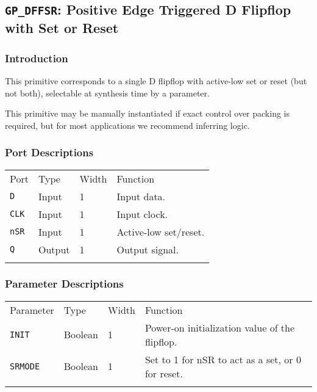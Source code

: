 \documentclass[11pt]{article}
\newcommand{\tokenstyle}[1]{\texttt{#1}}
\newcommand{\whenstyle}[1]{{\fontseries{sb}\selectfont#1}}
\newcommand{\thinhline}{\Xhline{1\arrayrulewidth}}
\newcommand{\thickhline}{\Xhline{2.5\arrayrulewidth}}
\begin{document}

\pagebreak
\subsection{\tokenstyle{GP\_DFFSR}: Positive Edge Triggered D Flipflop with Set or Reset}
\label{gp-dffsr}

\subsubsection{Introduction}
This primitive corresponds to a single D flipflop with active-low set or reset (but not both), selectable at synthesis
time by a parameter.

This primitive may be manually instantiated if exact control over packing is required, but for most applications we
recommend inferring logic.

\subsubsection{Port Descriptions}

\begin{tabularx}{\textwidth}{lllX}
\thinhline
\whenstyle{Port} & \whenstyle{Type} & \whenstyle{Width} & \whenstyle{Function} \\
\thickhline
\tokenstyle{D} & Input & 1 & Input data. \\
\thinhline
\tokenstyle{CLK} & Input & 1 & Input clock. \\
\thinhline
\tokenstyle{nSR} & Input & 1 & Active-low set/reset. \\
\thinhline
\tokenstyle{Q} & Output & 1 & Output signal. \\
\thinhline
\end{tabularx}

\subsubsection{Parameter Descriptions}

\begin{tabularx}{\textwidth}{lllX}
\thinhline
\whenstyle{Parameter} & \whenstyle{Type} & \whenstyle{Width} & \whenstyle{Function} \\
\thickhline
\tokenstyle{INIT} & Boolean & 1 & Power-on initialization value of the flipflop. \\
\thinhline
\tokenstyle{SRMODE} & Boolean & 1 & Set to 1 for nSR to act as a set, or 0 for reset. \\
\thinhline
\end{tabularx}
\end{document}
